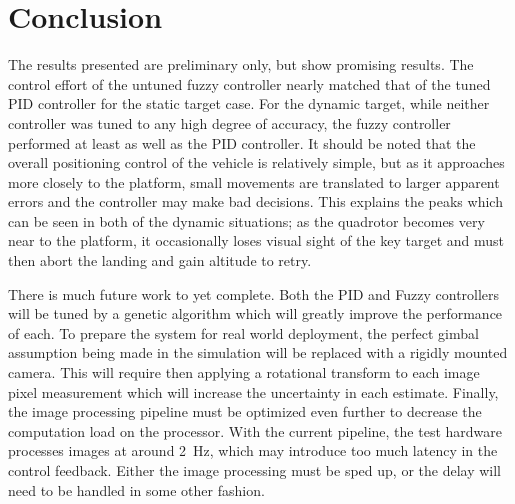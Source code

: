 \section{Conclusion}
The results presented are preliminary only, but show promising results. The control effort of the untuned
fuzzy controller nearly matched that of the tuned PID controller for the  static target case. For the dynamic
target, while neither controller was tuned to any high degree of accuracy, the fuzzy controller performed at
least as well as the PID controller. It should be noted that the overall positioning control of the
vehicle is relatively simple, but as it approaches more closely to the platform, small movements are
translated to larger apparent errors and the controller may make bad decisions. This explains the peaks which
can be seen in both of the dynamic situations; as the quadrotor becomes very near to the platform, it
occasionally loses visual sight of the key target and must then abort the landing and gain altitude to retry.

There is much future work to yet complete. Both the PID and Fuzzy controllers will be tuned by a genetic
algorithm which will greatly improve the performance of each. To prepare the system for real world
deployment, the perfect gimbal assumption being made in the simulation will be replaced with a rigidly mounted
camera. This will require then applying a rotational transform to each image pixel measurement which will
increase the uncertainty in each estimate. Finally, the image processing pipeline must be optimized even
further to decrease the computation load on the processor. With the current pipeline, the test hardware
processes images at around \SI{2}{\Hz}, which may introduce too much latency in the control feedback. Either
the image processing must be sped up, or the delay will need to be handled in some other fashion.


